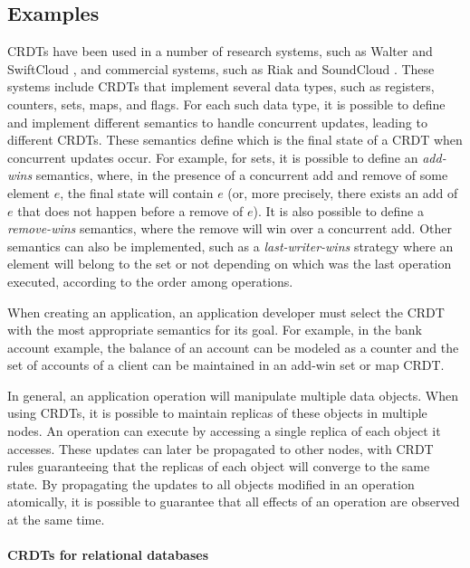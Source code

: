\documentclass[11pt]{article}
\begin{document}
\subsection{Examples}

CRDTs have been used in a number of research systems, such as Walter \cite{walter}
and SwiftCloud \cite{Zawirski15Write},
and commercial systems, such as Riak \cite{riak} and SoundCloud \cite{soundcloud}.
These systems include CRDTs that implement several data types, such as
registers, counters, sets, maps, and flags. For each such data type, it is possible to define and implement different semantics
to handle concurrent updates, leading to different CRDTs.
These semantics define which is the final state of a CRDT when
concurrent updates occur.
For example, for sets, it is possible to define an \emph{add-wins} semantics,
where, in the presence of a concurrent add and remove of some element $e$,
the final state will contain $e$ (or, more precisely, there exists an add of $e$
that does not happen before a remove of $e$).
It is also possible to define a \emph{remove-wins} semantics, where the remove will
win over a concurrent add.
Other semantics can also be implemented, such as a \emph{last-writer-wins} strategy where
an element will belong to the set or not depending on which was the last operation
executed, according to the order among operations.

When creating an application, an application developer must select the CRDT
with the most appropriate semantics for its goal.
For example, in the bank account example, the balance of an account can be modeled
as a counter and the set of accounts of a client can be maintained in an add-win set or map CRDT.

In general, an application operation will manipulate multiple data objects.
When using CRDTs, it is possible to maintain replicas of these objects in multiple nodes.
An operation can execute by accessing a single replica of each object it accesses.
These updates can later be propagated to other nodes, with CRDT rules guaranteeing
that the replicas of each object will converge to the same state.
By propagating the updates to all objects modified in an operation atomically,
it is possible to guarantee that all effects of an operation are observed at the
same time.

\paragraph{CRDTs for relational databases}
\end{document}
